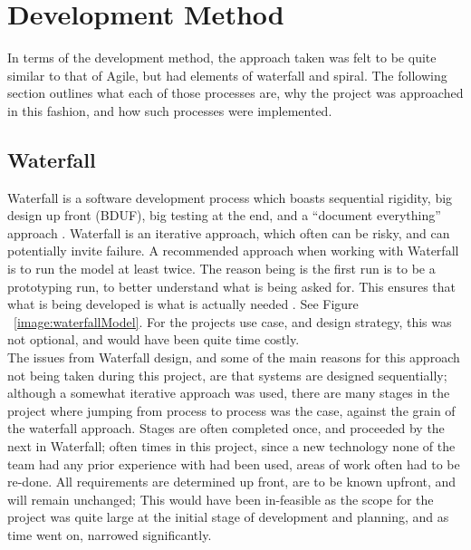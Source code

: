 \section{Development Method}
In terms of the development method, the approach taken was felt to be quite similar to that of Agile, but had elements of waterfall and spiral. The following section outlines what each of those processes are, why the project was approached in this fashion, and how such processes were implemented.

\subsection{Waterfall}
Waterfall is a software development process which boasts sequential rigidity, big design up front (BDUF), big testing at the end, and a “document everything” approach \cite{palmquist2013parallel}. Waterfall is an iterative approach, which often can be risky, and can potentially invite failure. A recommended approach when working with Waterfall is to run the model at least twice. The reason being is the first run is to be a prototyping run, to better understand what is being asked for. This ensures that what is being developed is what is actually needed  \cite{palmquist2013parallel}. See Figure ~\ref{image:waterfallModel}. For the projects use case, and design strategy, this was not optional, and would have been quite time costly.
\\ The issues from Waterfall design, and some of the main reasons for this approach not being taken during this project, are that systems are designed sequentially; although a somewhat iterative approach was used, there are many stages in the project where jumping from process to process was the case, against the grain of the waterfall approach. Stages are often completed once, and proceeded by the next in Waterfall; often times in this project, since a new technology none of the team had any prior experience with had been used, areas of work often had to be re-done. All requirements are determined up front, are to be known upfront, and will remain unchanged; This would have been in-feasible as the scope for the project was quite large at the initial stage of development and planning, and as time went on, narrowed significantly. 

